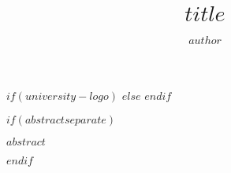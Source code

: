 \documentclass[a4paper, $if(page-layout)$$page-layout$$endif$]{templates/ociamthesis}
\title{$title$}
\author{$author$}
\begin{document}
\setlength{\textbaselineskip}{$linespacing$}

\setlength{\frontmatterbaselineskip}{$frontmatter-linespacing$}

\setlength{\abstractseparatelineskip}{13pt plus1pt minus1pt}
\setlength{\abstractseparateparskip}{0pt plus 1pt}

\setlength{\parskip}{8pt plus 4pt minus 1pt}
\setlength{\parindent}{0pt}

%
%
$if(university-logo)$
\def\crest{{\texttt{[image: \$university-logo\$]}}}
$else$
\def\crest{}
$endif$
\renewcommand{\university}{$university$}
\renewcommand{\submittedtext}{$submitted-text$}
\renewcommand{\thesistitlesize}{\fontsize{$title-size$}{$title-size-linespacing$}\selectfont}
\renewcommand{\gapbeforecrest}{$gap-before-crest$}
\renewcommand{\gapaftercrest}{$gap-after-crest$}


\setlength{\baselineskip}{\textbaselineskip}



\setcounter{secnumdepth}{$section-numbering-depth$}
\setcounter{tocdepth}{$toc-depth$}


$if(abstractseparate)$
\begin{abstractseparate}
  $abstract$
\end{abstractseparate}
$endif$
\end{document}
